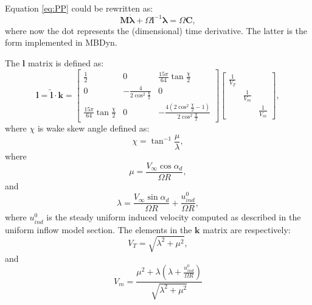Equation \ref{eq:PP} could be rewritten as:
\begin{equation}
\mathbf{M} \boldsymbol{\dot{\lambda}} + \Omega \mathbf{l}^{-1} \boldsymbol{\lambda} =
\Omega \mathbf{C},
\end{equation}
where now the dot represents the (dimensional) time derivative. The latter is the 
form implemented in MBDyn.

The $\mathbf{l}$ matrix is defined as:
\begin{equation}
\mathbf{l} = \mathbf{\tilde{l}} \cdot \mathbf{k} = 
\left[
\begin{array}{ccc}
\frac{1}{2} & 0 & \frac{15 \pi}{64} \tan{\frac{\chi}{2}} \\
 0 & -\frac{4}{2 \cos^2{\frac{\chi}{2}}} & 0 \\
\frac{15 \pi}{64} \tan{\frac{\chi}{2}} & 0 &
-\frac{4 ( 2 \cos^2{\frac{\chi}{2}} - 1 ) }{2 \cos^2{\frac{\chi}{2}}}
\end{array}
\right] \left[
\begin{array}{ccc}
\frac{1}{V_T} & & \\
& \frac{1}{V_m} & \\
& & \frac{1}{V_m}
\end{array}
\right],
\end{equation}
where $\chi$ is wake skew angle defined as:
\begin{equation}
\chi = \tan^{-1}{\frac{\mu}{\lambda}},
\end{equation}
where 
\begin{equation}
\mu = \frac{ V_\infty \cos{\alpha_d}}{\Omega R},
\end{equation}
and
\begin{equation}
\lambda = \frac{ V_\infty \sin{\alpha_d}}{\Omega R} + 
\frac{u_{ind}^{0}}{\Omega R},
\end{equation}
where $u_{ind}^{0}$ is the steady uniform induced velocity
computed as described in the uniform inflow model section.
The elements in the $\mathbf{k}$ matrix are respectively:
\begin{equation}
V_T = \sqrt{\lambda^2 + \mu^2},
\end{equation}
and
\begin{equation}
V_m = \frac{\mu^2 + \lambda \left( \lambda + \frac{u_{ind}^{0}}{\Omega R} \right)}
{\sqrt{\lambda^2 + \mu^2}}
\end{equation}


